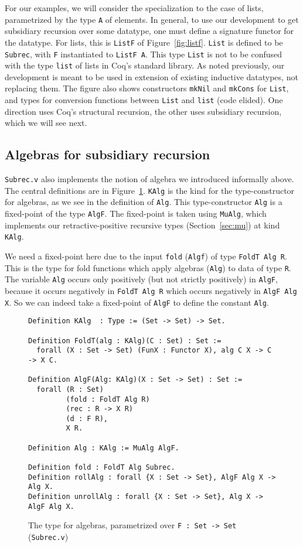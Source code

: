 \documentclass[a4paper,USenglish]{lipics-v2021}
\begin{document}
For our examples, we will consider the specialization to the case of
lists, parametrized by the type \verb|A| of elements.  In general, to
use our development to get subsidiary recursion over some datatype,
one must define a signature functor for the datatype.  For lists, this
is \verb|ListF| of Figure~\ref{fig:listf}.  \verb|List| is defined to
be \verb|Subrec|, with \verb|F| instantiated to \verb|ListF A|.  This
type \verb|List| is not to be confused with the type \verb|list| of
lists in Coq's standard library.  As noted previously, our development
is meant to be used in extension of existing inductive datatypes, not
replacing them.  The figure also shows constructors \verb|mkNil| and
\verb|mkCons| for \verb|List|, and types for conversion functions
between \verb|List| and \verb|list| (code elided). One direction uses
Coq's structural recursion, the other uses subsidiary recursion, which
we will see next.
  

\subsection{Algebras for subsidiary recursion}

\verb|Subrec.v| also implements the notion of algebra we introduced
informally above.  The central definitions are in
Figure~\ref{fig:algf}.  \verb|KAlg| is the kind for the
type-constructor for algebras, as we see in the definition of
\verb|Alg|.  This type-constructor \verb|Alg| is a fixed-point of the
type \verb|AlgF|.  The fixed-point is taken using \verb|MuAlg|, which
implements our retractive-positive recursive types
(Section~\ref{sec:mu}) at kind \verb|KAlg|.  

We need a fixed-point here due to the input \verb|fold| (\verb|Algf|)
of type \verb|FoldT Alg R|.  This is the type for fold functions which
apply algebras (\verb|Alg|) to data of type \verb|R|.  The variable \verb|Alg| occurs only positively (but not
strictly positively) in \verb|AlgF|, because it occurs negatively in
\verb|FoldT Alg R| which occurs negatively in \verb|AlgF Alg X|.  So
we can indeed take a fixed-point of \verb|AlgF| to define the constant
\verb|Alg|.

\begin{figure}
\begin{verbatim}
Definition KAlg  : Type := (Set -> Set) -> Set.

Definition FoldT(alg : KAlg)(C : Set) : Set :=
  forall (X : Set -> Set) (FunX : Functor X), alg C X -> C -> X C.

Definition AlgF(Alg: KAlg)(X : Set -> Set) : Set :=
  forall (R : Set)
         (fold : FoldT Alg R)
         (rec : R -> X R)      
         (d : F R),             
         X R.

Definition Alg : KAlg := MuAlg AlgF.

Definition fold : FoldT Alg Subrec.
Definition rollAlg : forall {X : Set -> Set}, AlgF Alg X -> Alg X.
Definition unrollAlg : forall {X : Set -> Set}, Alg X -> AlgF Alg X.
\end{verbatim}
\caption{The type for algebras, parametrized over \texttt{F : Set -> Set} (\texttt{Subrec.v})}
\label{fig:algf}
\end{figure}
\end{document}
